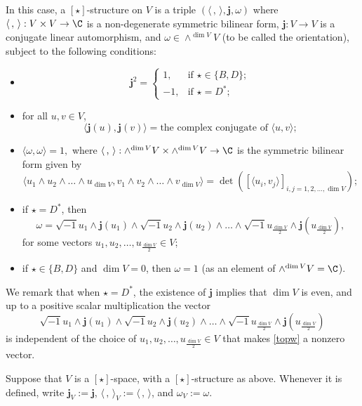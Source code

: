 \documentclass[12pt]{amsart}
\newcommand{\la}{\langle}
\newcommand{\ra}{\rangle}
\newcommand{\be}{\begin {equation}}
\newcommand{\ee}{\end {equation}}
\numberwithin{equation}{section}
\theoremstyle{remark}
\begin{document}
 In this case, a $[\star]$-structure on $V$ is a triple $(\la\,,\,\ra, \mathbf j, \omega)$ where
 $ \la\,,\,\ra: V\times V\rightarrow \C $ is a non-degenerate symmetric bilinear form,  $\mathbf j: V\rightarrow V$ is a conjugate linear automorphism, and $\omega\in \wedge^{\dim V} V$ (to be called the orientation), subject to the following conditions: %
 \begin{itemize}
 \item
 \[
  \mathbf j^2= \begin{cases}
  1,  &  \text{if $\star\in\{B,D\}$};\\
  -1,    &  \text{if $\star=D^*$};
    \end{cases}
\]
\item for all $u,v\in V$,
 \[
   \la \mathbf j(u), \mathbf j(v)\ra =\textrm{the complex conjugate of  $\la u, v\ra$};
 \]
 \item
$
 \la \omega, \omega\ra=1,$
where $\la\,,\,\ra: \wedge^{\dim V} V\times \wedge^{\dim V} V\rightarrow \C$ is the symmetric bilinear form given by
\be\label{laraw}
  \la u_1\wedge u_2\wedge \dots \wedge u_{\dim V}, v_1\wedge v_2\wedge \dots \wedge v_{\dim V} \ra=\det \left( [\la u_i, v_j \ra]_{i,j=1,2, \dots, \dim V}\right);
\ee
 \item
if $\star=D^*$, then
\be\label{dstaro}
 \omega=\sqrt{-1} u_1\wedge \mathbf j(u_1)\wedge \sqrt{-1} u_2\wedge \mathbf j(u_2)\wedge \dots \wedge \sqrt{-1} u_{\frac{\dim V}{2}} \wedge \mathbf j(u_{\frac{\dim V}{2}}),
 \ee
 for some  vectors $u_1, u_2, \dots, u_{\frac{\dim V}{2}}\in V$;
 \item
if $\star\in \{B,D\}$ and $\dim V=0$, then $\omega=1$ (as an element of $\wedge^{\dim V} V=\C$).
 \end{itemize}

We remark that when  $\star=D^*$,  the existence of $\mathbf j$ implies that $\dim V$ is even, and up to a positive scalar multiplication
the vector
 \be\label{topw}
 \sqrt{-1} u_1\wedge \mathbf j(u_1)\wedge \sqrt{-1} u_2\wedge \mathbf j(u_2)\wedge \dots \wedge \sqrt{-1} u_{\frac{\dim V}{2}} \wedge \mathbf j(u_{\frac{\dim V}{2}})
 \ee
 is independent of the choice of  $u_1, u_2, \dots, u_{\frac{\dim V}{2}}\in V$ that makes \eqref{topw} a nonzero vector.


Suppose that $V$ is a $[\star]$-space, with a $[\star]$-structure as above. Whenever it is defined, write $\mathbf j_V:=\mathbf j$, $\la\,,\,\ra_V:=\la\,,\,\ra$, and $\omega_V:=\omega$.
\end{document}
